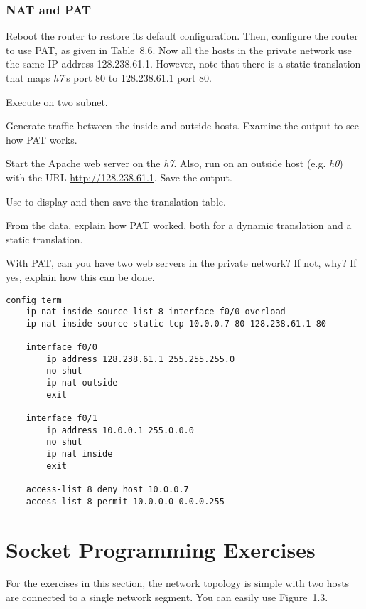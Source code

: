 \documentclass{../UTNetLab}
\begin{document}
\section{NAT and PAT}
Reboot the router to restore its default configuration.
Then, configure the router to use PAT, as given in \hyperref[tab:8.6]{Table~8.6}.
Now all the hosts in the private network use the same IP address 128.238.61.1.
However, note that there is a static translation that maps \textit{h7}’s port 80 to 128.238.61.1 port 80.

Execute  on two subnet.

Generate traffic between the inside and outside hosts.
Examine the  output to see how PAT works.

Start the Apache web server on the \textit{h7}.
Also, run  on an outside host (e.g. \textit{h0}) with the URL \url{http://128.238.61.1}.
Save the  output.

Use  to display and then save the translation table.

\begin{report}
    \item From the  data, explain how PAT worked, both for a dynamic translation and a static translation.

    \item With PAT, can you have two web servers in the private network?
    If not, why?
    If yes, explain how this can be done.
\end{report}

\begin{lstlisting}[language={cisco}, caption={PAT Router Configuration in \hyperref[fig:8.7]{Figure~8.7} (Table~8.6)\label{tab:8.6}}]
config term
    ip nat inside source list 8 interface f0/0 overload
    ip nat inside source static tcp 10.0.0.7 80 128.238.61.1 80

    interface f0/0
        ip address 128.238.61.1 255.255.255.0
        no shut
        ip nat outside
        exit

    interface f0/1
        ip address 10.0.0.1 255.0.0.0
        no shut
        ip nat inside
        exit

    access-list 8 deny host 10.0.0.7
    access-list 8 permit 10.0.0.0 0.0.0.255
    \end{lstlisting}

\part{Socket Programming Exercises}
For the exercises in this section, the network topology is simple with two hosts are connected to a single network segment.
You can easily use Figure~1.3.
\end{document}

